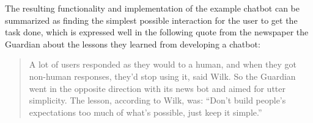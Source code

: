 The resulting functionality and implementation of the example chatbot can be summarized as finding the simplest possible interaction for the user to get the task done, which is expressed well in the following quote from the newspaper the Guardian\cite{digiday} about the lessons they learned from developing a chatbot:

\begin{quote}
A lot of users responded as they would to a human, and when they got non-human responses, they’d stop using it, said Wilk. So the Guardian went in the opposite direction with its news bot and aimed for utter simplicity. The lesson, according to Wilk, was: “Don’t build people’s expectations too much of what’s possible, just keep it simple.”
\end{quote}
